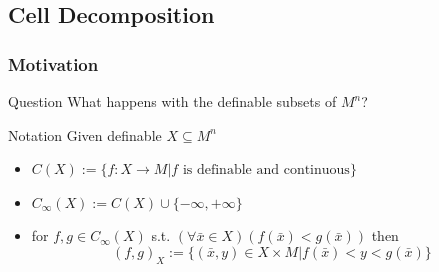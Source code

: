\subsection{Cell Decomposition}

\begin{frame}[c]\frametitle{Motivation}
	
	\begin{beamerboxesrounded}[shadow=true, upper=question]{Question}
		What happens with the definable subsets of $M^n$?
	\end{beamerboxesrounded}
    
	\begin{beamerboxesrounded}[shadow=true]{Notation}
		Given definable $X \subseteq M^n$
		\begin{itemize}
			\item $C(X):= \{ f:X \to M|f \text{ is definable and continuous}\}$
			\item $C_\infty(X):=C(X) \cup \{ -\infty, +\infty \}$
			\item for $f,g \in C_\infty(X)$ s.t. $(\forall \bar{x} \in X)(f(\bar{x})<g(\bar{x}))$ then 
			$$(f,g)_X := \{  (\bar{x},y)\in X \times M|f(\bar{x})<y<g(\bar{x})\}$$
		\end{itemize}
	\end{beamerboxesrounded}

\end{frame}

